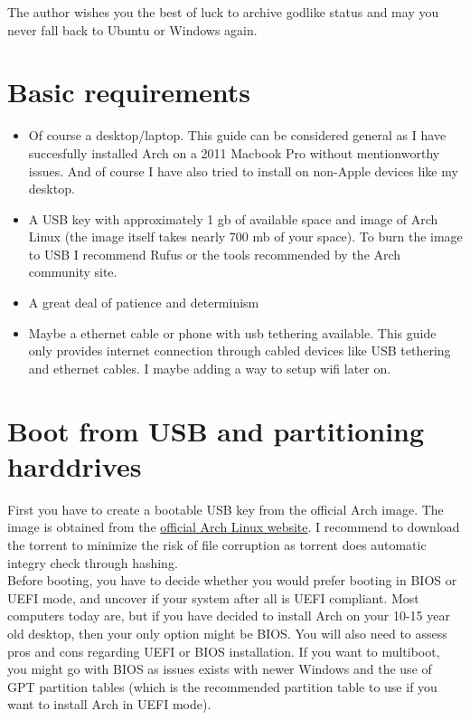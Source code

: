 \documentclass{article}
\begin{document}
	The author wishes you the best of luck to archive godlike status and may you never fall back to Ubuntu or Windows again.
	
	\pagebreak
	\tableofcontents
	\pagebreak
	
	\section{Basic requirements}
	
	\begin{itemize}
		\item Of course a desktop/laptop. This guide can be considered general as I have succesfully installed Arch on a 2011 Macbook Pro without mentionworthy issues. And of course I have also tried to install on non-Apple devices like my desktop.
		\item A USB key with approximately 1 gb of available space and image of Arch Linux (the image itself takes nearly 700 mb of your space). To burn the image to USB I recommend Rufus or the tools recommended by the Arch community site. 
		\item A great deal of patience and determinism
		\item Maybe a ethernet cable or phone with usb tethering available. This guide only provides internet connection through cabled devices like USB tethering and ethernet cables. I maybe adding a way to setup wifi later on.
		
	\end{itemize}
	\section{Boot from USB and partitioning harddrives}
	
	First you have to create a bootable USB key from the official Arch image. The image is obtained from the \href{https://www.archlinux.org/download/}{official Arch Linux website}. I recommend to download the torrent to minimize the risk of file corruption as torrent does automatic integry check through hashing.\\
	
	Before booting, you have to decide whether you would prefer booting in BIOS or UEFI mode, and uncover if your system after all is UEFI compliant. Most computers today are, but if you have decided to install Arch on your 10-15 year old desktop, then your only option might be BIOS. You will also need to assess pros and cons regarding UEFI or BIOS installation. If you want to multiboot, you might go with BIOS as issues exists with newer Windows and the use of GPT partition tables (which is the recommended partition table to use if you want to install Arch in UEFI mode). \\
	
\end{document}
